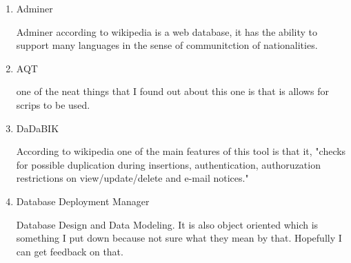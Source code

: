 \documentclass{article}
\begin{document}
\begin{enumerate}
\item  Adminer

Adminer according to wikipedia is a web database, it has the ability to support many languages in the sense of communitction of nationalities. 

\item AQT

one of the neat things that I found out about this one is that is allows for scrips to be used. 

\item DaDaBIK

According to wikipedia one of the main features of this tool is that it, "checks for possible duplication  during insertions, authentication, authoruzation restrictions on view/update/delete and e-mail notices."
\item Database Deployment Manager

Database Design and  Data Modeling. It is also object oriented which is something I put down because not sure what they mean by that. Hopefully I can get feedback on that. 



\end{enumerate}
\end{document}
